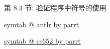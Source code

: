 \begin{frame}{}
  \begin{center}

    \vspace{0.30cm}
    第 8.4 节: 验证程序中符号的使用
  \end{center}
\end{frame}

\begin{frame}{}
  \begin{center}
    \href{https://github.com/antlr/symtab}{symtab @ antlr by parrt}

    \vspace{0.80cm}
    \href{https://github.com/parrt/cs652/tree/master/lectures/code/symtab/src}{symtab @ cs652 by parrt}
  \end{center}
\end{frame}
